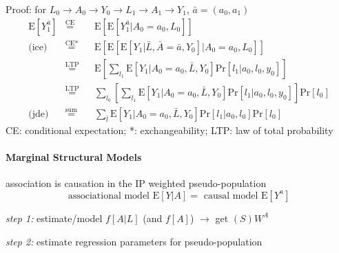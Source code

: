 \documentclass[8pt,oneside]{extarticle}
\begin{document}
\begin{multicols}{2}
\begin{mdframed}[style=MyFrame,nobreak=true, innerleftmargin=2pt, innerrightmargin=2pt]
Proof: for $L_0 \rightarrow A_0 \rightarrow Y_0 \rightarrow L_1 \rightarrow A_1 \rightarrow Y_1$, $\bar{a} =(a_0,a_1)$ 
\begin{alignat*}{4} 
\mathrm{E}\left[Y_1^{\bar{a}}\right] & \overset{\text{CE}}{=} && \mathrm{E}\left[\mathrm{E}\left[   Y_1^{\bar{a}}|A_0{=}a_0, L_0   \right]\right]  \\ 
\text{(ice)}\,\,\, &\overset{\text{CE*}}{=} && \mathrm{E}\left[\mathrm{E}\left[  \mathrm{E}\left[Y_1|\bar{L}, \bar{A}{=}\bar{a}, Y_0 \right]| A_0{=}a_0, L_0   \right]\right]  \\ 
&\overset{\text{LTP}}{=} && \mathrm{E}\left[ \sum\nolimits_{l_1} \mathrm{E}\left[Y_1|A_0{=}a_0, \bar{L}, Y_0\right] \mathrm{Pr}\left[l_1|a_0,l_0, y_0\right]         \right] \\
&\overset{\text{LTP}}{=} && \sum\nolimits_{l_0}\!\!\!\left[ \sum\nolimits_{l_1} \!\!\!\mathrm{E}\left[Y_1|A_0{=}a_0, \bar{L}, Y_0\right] \mathrm{Pr}\left[l_1|a_0,l_0, y_0\right]         \right] \mathrm{Pr}\left[l_0\right] \\
\text{(jde)}\,\,\, &\overset{\text{sum}}{=} &&  \sum\nolimits_{\bar{l}} \mathrm{E}\left[Y_1|A_0{=}a_0, \bar{L}, Y_0\right] \mathrm{Pr}\left[l_1|a_0,l_0\right]          \mathrm{Pr}\left[l_0\right] 
\end{alignat*}
CE: conditional expectation; *: exchangeability; \newline LTP: law of total probability
\end{mdframed}


















\paragraph{\large Marginal Structural Models} association is causation in the IP weighted pseudo-population 
$$\text{associational model } \mathrm{E}\left[Y|A\right] = \text{ causal model } \mathrm{E}\left[Y^a\right]$$

\noindent \textit{step 1:} estimate/model $f\left[A|L\right]$ (and $f\left[A\right]$) $\rightarrow$ get $(S)W^A$

\noindent \textit{step 2:} estimate regression parameters for pseudo-population


\end{multicols}
\end{document}
